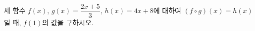 \hspace*{2mm}\begin{minipage}[t]{\dimexpr\linewidth-2mm\relax}\vspace{0pt}
세 함수 $f(x)$, $g(x)=\dfrac{2x+5}{3}$, $h(x)=4x+8$에 대하여 $(f\circ g)(x)=h(x)$일 때, $f(1)$의 값을 구하시오.\end{minipage}
